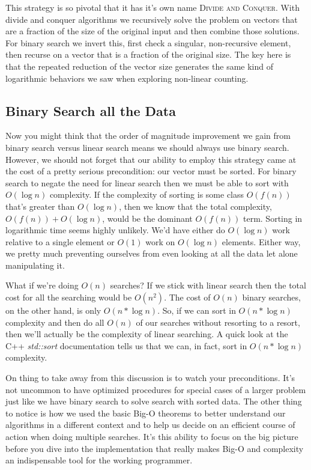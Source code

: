 \documentclass[]{tufte-handout}
\begin{document}
This strategy is so pivotal that it has it's own name \textsc{Divide and Conquer}. With divide and conquer algorithms we recursively solve the problem on vectors that are a fraction of the size of the original input and then combine those solutions. For binary search we invert this, first check a singular, non-recursive element, then recurse on a vector that is a fraction of the original size. The key here is that the repeated reduction of the vector size generates the same kind of logarithmic behaviors we saw when exploring non-linear counting. 

\subsection{Binary Search all the Data}

Now you might think that the order of magnitude improvement we gain from binary search versus linear search means we should always use binary search. However, we should not forget that our ability to employ this strategy came at the cost of a pretty serious precondition: our vector must be sorted. For binary search to negate the need for linear search then we must be able to sort with $O(\log{n})$ complexity. If the complexity of sorting is some class $O(f(n))$ that's greater than $O(\log{n})$, then we know that the total complexity, $O(f(n))+O(\log n)$, would be the dominant $O(f(n))$ term. Sorting in logarithmic time seems highly unlikely. We'd have either do $O(\log n)$ work relative to a single element or $O(1)$ work on $O(\log n)$ elements. Either way, we pretty much preventing ourselves from even looking at all the data let alone manipulating it. 

What if we're doing $O(n)$ searches? If we stick with linear search then the total cost for all the searching would be $O(n^2)$.  The cost of $O(n)$ binary searches, on the other hand, is only $O(n*\log{n})$. So, if we can sort in $O(n*\log{n})$ complexity and then do all $O(n)$ of our searches without resorting to a resort, then we'll actually be the complexity of linear searching. A quick look at the C++ \textit{std::sort} documentation tells us that we can, in fact, sort in $O(n*\log{n})$ complexity. 

On thing to take away from this discussion is to watch your preconditions. It's not uncommon to have optimized procedures for special cases of a larger problem just like we have binary search to solve search with sorted data. The other thing to notice is how we used the basic Big-O theorems to better understand our algorithms in a different context and to help us decide on an efficient course of action when doing multiple searches. It's this ability to focus on the big picture before you dive into the implementation that really makes Big-O and complexity an indispensable tool for the working programmer. 
\end{document}
